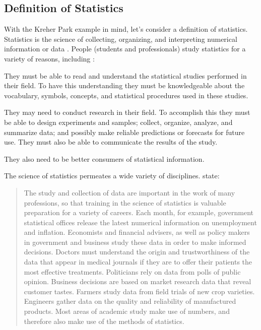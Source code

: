 \documentclass[10pt,openany]{book}\usepackage[]{graphicx}\usepackage[]{color}
\begin{document}
\subsection{Definition of Statistics}
With the Kreher Park example in mind, let's consider a definition of statistics.  Statistics is the science of collecting, organizing, and interpreting numerical information or data \citep{MooreMcCabe1998}.  People (students and professionals) study statistics for a variety of reasons, including \citep{Bluman2000}:
\begin{Enumerate}
  \item They must be able to read and understand the statistical studies performed in their field. To have this understanding they must be knowledgeable about the vocabulary, symbols, concepts, and statistical procedures used in these studies.
  \item They may need to conduct research in their field. To accomplish this they must be able to design experiments and samples; collect, organize, analyze, and summarize data; and possibly make reliable predictions or forecasts for future use. They must also be able to communicate the results of the study.
  \item They also need to be better consumers of statistical information.
\end{Enumerate}

The science of statistics permeates a wide variety of disciplines. \cite{MooreMcCabe1998} state:
\begin{quote}
The study and collection of data are important in the work of many professions, so that training in the science of statistics is valuable preparation for a variety of careers.  Each month, for example, government statistical offices release the latest numerical information on unemployment and inflation.  Economists and financial advisers, as well as policy makers in government and business study these data in order to make informed decisions.  Doctors must understand the origin and trustworthiness of the data that appear in medical journals if they are to offer their patients the most effective treatments. Politicians rely on data from polls of public opinion.  Business decisions are based on market research data that reveal customer tastes.  Farmers study data from field trials of new crop varieties.  Engineers gather data on the quality and reliability of manufactured products.  Most areas of academic study make use of numbers, and therefore also make use of the methods of statistics.
\end{quote}
\end{document}
